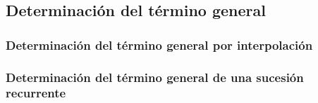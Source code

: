 \subsection{Determinación del término general}


\subsubsection{Determinación del término general por interpolación}


\subsubsection{Determinación del término general de una sucesión recurrente}

